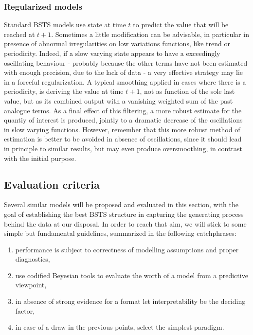 \documentclass[11pt,twoside]{report}
\begin{document}
\subsubsection{Regularized models}
Standard BSTS models use state at time $ t $ to predict the value that will be reached at $ t+1 $. Sometimes a little modification can be advisable, in particular in presence of abnormal irregularities on low variations functions, like trend or periodicity. Indeed, if a slow varying state appears to have a exceedingly oscillating behaviour - probably because the other terms have not been estimated with enough precision, due to the lack of data - a very effective strategy may lie in a forceful regularization. A typical smoothing applied in cases where there is a periodicity, is deriving the value at time $ t+1 $, not as function of the sole last value, but as its combined output with a vanishing weighted sum of the past analogue terms. As a final effect of this filtering, a more robust estimate for the quantiy of interest is produced, jointly to a dramatic decrease of the oscillations in slow varying functions. However, remember that this more robust method of estimation is better to be avoided in absence of oscillations, since it should lead in principle to similar results, but may even produce oversmoothing, in contrast with the initial purpose.

\subsection{Evaluation criteria}
Several similar models will be proposed and evaluated in this section, with the goal of establishing the best BSTS structure in capturing the generating process behind the data at our disposal. In order to reach that aim, we will stick to some simple but fundamental guidelines, summarized in the following catchphrases:

\begin{enumerate}
	\item performance is subject to correctness of modelling assumptions and proper diagnostics,
	\item use codified Beyesian tools to evaluate the worth of a model from a predictive viewpoint,
	\item in absence of strong evidence for a format let interpretability be the deciding factor,
	\item in case of a draw in the previous points, select the simplest paradigm.
\end{enumerate}
\end{document}
